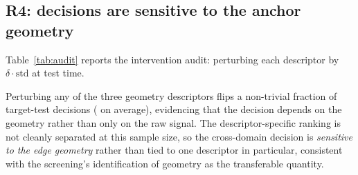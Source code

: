 \subsection{R4: decisions are sensitive to the anchor geometry}
\label{sec:r4}

Table~\ref{tab:audit} reports the intervention audit: perturbing each descriptor
by $\delta\cdot\mathrm{std}$ at test time.

\begin{table}[t]
  \centering
  \small
  \caption{Intervention audit: flip rate when descriptor $j$ is perturbed at
  scale $\delta$ ($\ast$ marks the per-protocol anchor). Perturbing any geometry
  descriptor flips a non-trivial fraction of decisions, evidencing that geometry
  participates in the cross-domain decision.}
  \label{tab:audit}
  
\end{table}

Perturbing any of the three geometry descriptors flips a non-trivial fraction of
target-test decisions (\FlipScale{} on average), evidencing that the decision
depends on the geometry rather than only on the raw signal. The
descriptor-specific ranking is not cleanly separated at this sample size, so
the cross-domain decision is \emph{sensitive to the edge geometry} rather than
tied to one descriptor in particular, consistent with the screening's
identification of geometry as the transferable quantity.
